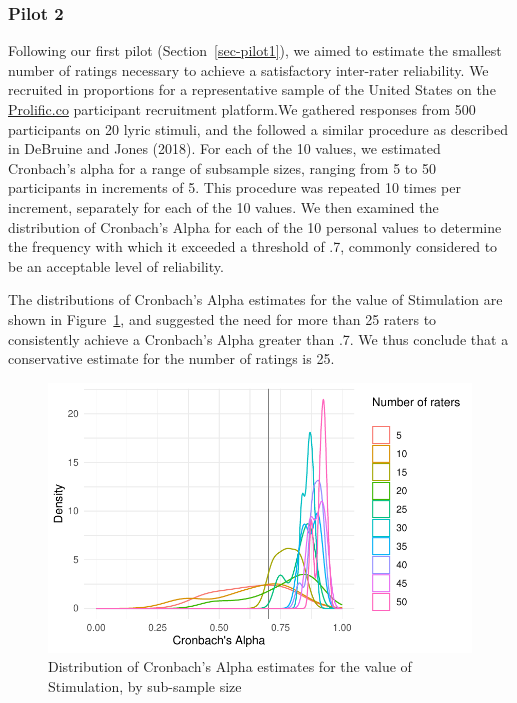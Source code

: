 \documentclass[
  letterpaper,
  DIV=11,
  numbers=noendperiod]{scrartcl}
\begin{document}
\hypertarget{sec-pilot2}{%
\subsubsection{Pilot 2}\label{sec-pilot2}}

Following our first pilot (Section~\ref{sec-pilot1}), we aimed to
estimate the smallest number of ratings necessary to achieve a
satisfactory inter-rater reliability. We recruited in proportions for a
representative sample of the United States on the
\href{https://www.prolific.co}{Prolific.co} participant recruitment
platform.We gathered responses from 500 participants on 20 lyric
stimuli, and the followed a similar procedure as described in DeBruine
and Jones (2018). For each of the 10 values, we estimated Cronbach's
alpha for a range of subsample sizes, ranging from 5 to 50 participants
in increments of 5. This procedure was repeated 10 times per increment,
separately for each of the 10 values. We then examined the distribution
of Cronbach's Alpha for each of the 10 personal values to determine the
frequency with which it exceeded a threshold of .7, commonly considered
to be an acceptable level of reliability.

The distributions of Cronbach's Alpha estimates for the value of
Stimulation are shown in Figure~\ref{fig-3}, and suggested the need for
more than 25 raters to consistently achieve a Cronbach's Alpha greater
than .7. We thus conclude that a conservative estimate for the number of
ratings is 25.

\begin{figure}

{\centering \includegraphics{pre-registration_pdf_files/figure-pdf/fig-3-1.pdf}

}

\caption{\label{fig-3}Distribution of Cronbach's Alpha estimates for the
value of Stimulation, by sub-sample size}

\end{figure}
\end{document}

